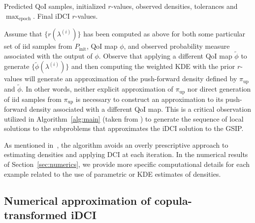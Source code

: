 \documentclass{article}
\newcounter{example}[section]
\newcommand{\initmeas}{P_{\text{init}}}
\newcommand{\updatedens}{\pi_{\text{up}}}
\begin{document}
\begin{algorithm}\caption{Iterative DCI (iDCI)}\label{alg:main}
\begin{algorithmic}
    \REQUIRE Predicted QoI samples, initialized $r$-values, observed densities, tolerances and $\max_\text{epoch}.$
            \ELSE
            \ENDIF
        \ENDFOR
            \ELSE
        \ENDIF
    \ENDFOR
    \ENSURE Final iDCI $r$-values.
\end{algorithmic}
\end{algorithm}

Assume that $\{r(\lambda^{(i)})\}$ has been computed as above for both some particular set of iid samples from $\initmeas$, QoI map $\phi$, and observed probability measure associated with the output of $\phi$.
Observe that applying a different QoI map $\tilde{\phi}$ to generate $\{\tilde{\phi}(\lambda^{(i)})\}$ and then computing the weighted KDE with the prior $r$-values will generate an approximation of the push-forward density defined by $\updatedens$ and $\tilde{\phi}$.
In other words, neither explicit approximation of $\updatedens$ nor direct generation of iid samples from $\updatedens$ is necessary to construct an approximation to its push-forward density associated with a different QoI map.
This is a critical observation utilized in Algorithm~\ref{alg:main} (taken from \cite{JBW+26}) to generate the sequence of local solutions to the subproblems that approximates the iDCI solution to the GSIP.

As mentioned in~\cite{JBW+26}, the algorithm avoids an overly prescriptive approach to estimating densities and applying DCI at each iteration.
In the numerical results of Section~\ref{sec:numerics}, we provide more specific computational details for each example related to the use of parametric or KDE estimates of densities.

\subsection{Numerical approximation of copula-transformed iDCI}\label{subsec:num_approx_copulas}
\end{document}
